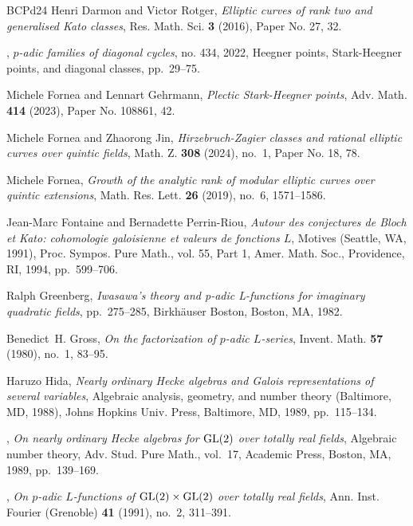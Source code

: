 \documentclass[10pt]{amsart}
\numberwithin{equation}{section}
\theoremstyle{definition}
\theoremstyle{remark} %
\begin{document}
\begin{thebibliography}{BCPd24}
Henri Darmon and Victor Rotger, \emph{Elliptic curves of rank two and generalised {K}ato classes}, Res. Math. Sci. \textbf{3} (2016), Paper No. 27, 32. 

\bysame, \emph{{$p$}-adic families of diagonal cycles}, no. 434, 2022, Heegner points, Stark-Heegner points, and diagonal classes, pp.~29--75. 

Michele Fornea and Lennart Gehrmann, \emph{Plectic {S}tark-{H}eegner points}, Adv. Math. \textbf{414} (2023), Paper No. 108861, 42. 

Michele Fornea and Zhaorong Jin, \emph{Hirzebruch-{Z}agier classes and rational elliptic curves over quintic fields}, Math. Z. \textbf{308} (2024), no.~1, Paper No. 18, 78. 

Michele Fornea, \emph{Growth of the analytic rank of modular elliptic curves over quintic extensions}, Math. Res. Lett. \textbf{26} (2019), no.~6, 1571--1586. 

Jean-Marc Fontaine and Bernadette {Perrin-Riou}, \emph{Autour des conjectures de {B}loch et {K}ato: cohomologie galoisienne et valeurs de fonctions {$L$}}, Motives ({S}eattle, {WA}, 1991), Proc. Sympos. Pure Math., vol. 55, Part 1, Amer. Math. Soc., Providence, RI, 1994, pp.~599--706. 

Ralph Greenberg, \emph{Iwasawa's theory and p-adic {L}-functions for imaginary quadratic fields}, pp.~275--285, Birkh{\"a}user Boston, Boston, MA, 1982.

Benedict~H. Gross, \emph{On the factorization of {$p$}-adic {$L$}-series}, Invent. Math. \textbf{57} (1980), no.~1, 83--95. 

Haruzo Hida, \emph{Nearly ordinary {H}ecke algebras and {G}alois representations of several variables}, Algebraic analysis, geometry, and number theory ({B}altimore, {MD}, 1988), Johns Hopkins Univ. Press, Baltimore, MD, 1989, pp.~115--134. 

\bysame, \emph{On nearly ordinary {H}ecke algebras for {${\rm GL}(2)$} over totally real fields}, Algebraic number theory, Adv. Stud. Pure Math., vol.~17, Academic Press, Boston, MA, 1989, pp.~139--169. 

\bysame, \emph{On {$p$}-adic {$L$}-functions of {${\rm GL}(2)\times {\rm GL}(2)$} over totally real fields}, Ann. Inst. Fourier (Grenoble) \textbf{41} (1991), no.~2, 311--391. 


\end{thebibliography}
\end{document}
